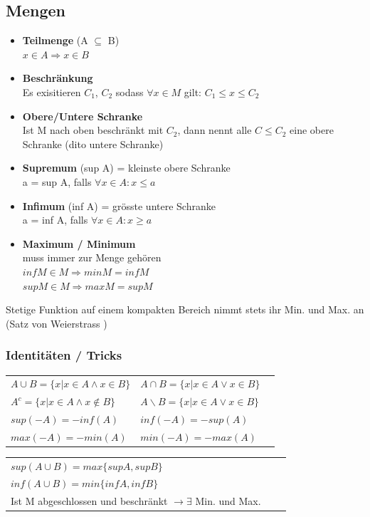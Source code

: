 \documentclass[6pt]{article}
\begin{document}
\begin{multicols*}{3}

\subsection*{Mengen}
\begin{itemize}[itemsep=1pt, parsep=2pt, leftmargin=*,align=left]
	\item {\bf Teilmenge} (A $\subseteq$ B) \\ $x \in A \Rightarrow x \in B$
	\item {\bf Beschr{\"a}nkung} \\Es exisitieren $C_1$, $C_2$ sodass $\forall x \in M$ gilt: $C_1 \leq x \leq C_2$
	\item {\bf Obere/Untere Schranke} \\ Ist M nach oben beschr{\"a}nkt mit $C_2$, dann nennt alle $C \leq C_2$ eine obere Schranke (dito untere Schranke)
	\item {\bf Supremum} (sup A) = kleinste obere Schranke \\ 
				a = sup A, falls $\forall x \in A : x \leq a$ 
	\item {\bf Infimum} (inf A) = gr{\"o}sste untere Schranke	 \\  
				a = inf A, falls $\forall x \in A: x \geq a$ 
	\item {\bf Maximum / Minimum}	\\ muss immer zur Menge geh{\"o}ren \\
				 $inf M \in M \Rightarrow min M = inf M$ \\
				 $sup M \in M \Rightarrow max M = sup M$
\end{itemize}
Stetige Funktion auf einem kompakten Bereich nimmt stets ihr Min. und Max. an (Satz von Weierstrass )

\subsubsection*{Identit{\"a}ten / Tricks}
\begin{tabular}{lll}
$A \cup B = \lbrace{x | x \in A \land x \in B}\rbrace$ 
	& $A \cap B = \lbrace{x | x \in A \lor x \in B}\rbrace $ \\
$A^c =\lbrace{x | x \in A \land x \not\in B }\rbrace$ 
	& $A\backslash B = \lbrace{x | x \in A \lor x \in B}\rbrace$ \\
$sup(-A)  = - inf(A)$  
	& $inf(-A) = - sup(A)$	 \\
$max(-A) = -min(A)$
	& 	 $min(-A) = - max(A)$ \\
\end{tabular}
\vspace{8mm}
\begin{tabular}{lll}
$sup(A \cup B) = max\lbrace{sup A, sup B}\rbrace$ \\
$inf(A \cup B) = min\lbrace{inf A, inf B}\rbrace$  \\
Ist M abgeschlossen und beschr{\"a}nkt $\rightarrow \exists$ Min. und Max. \\
\end{tabular}


\end{multicols*}
\end{document}
